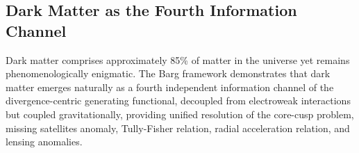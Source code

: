 
\subsection{Dark Matter as the Fourth Information Channel}
\label{subsec:darkMatterFourthChannel}

\begin{overview}
Dark matter comprises approximately 85\% of matter in the universe yet remains phenomenologically enigmatic. The Barg framework demonstrates that dark matter emerges naturally as a fourth independent information channel of the divergence-centric generating functional, decoupled from electroweak interactions but coupled gravitationally, providing unified resolution of the core-cusp problem, missing satellites anomaly, Tully-Fisher relation, radial acceleration relation, and lensing anomalies.
\end{overview}

